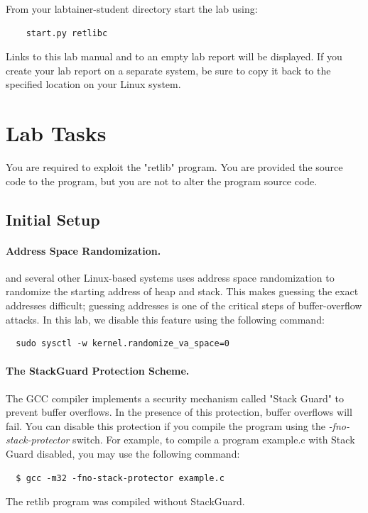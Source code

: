 From your labtainer-student directory start the lab using:
\begin{verbatim}
    start.py retlibc
\end{verbatim}
Links to this lab manual and to an empty lab report will be displayed.  If you create your lab report on a separate system,
be sure to copy it back to the specified location on your Linux system.


\section{Lab Tasks}
You are required to exploit the "retlib" program.  You are provided the
source code to the program, but you are not to alter the program source code.

\subsection{Initial Setup}

\paragraph{Address Space Randomization.}
\ubuntu and several other Linux-based systems uses address space
randomization to randomize the starting address of heap and
stack. This makes guessing the exact addresses difficult; guessing
addresses is one of the critical steps of buffer-overflow attacks.  In
this lab, we disable this feature using the following command:

\begin{verbatim}
  sudo sysctl -w kernel.randomize_va_space=0
\end{verbatim}


\paragraph{The StackGuard Protection Scheme.}
The GCC compiler implements a security mechanism called
"Stack Guard" to prevent buffer overflows. In the presence of this
protection, buffer overflows will fail. You can disable this
protection if you compile the program using the
\emph{-fno-stack-protector} switch. For example, to compile a program
example.c with Stack Guard disabled, you may use the following command:
\begin{verbatim}
  $ gcc -m32 -fno-stack-protector example.c
\end{verbatim}

The retlib program was compiled without StackGuard.

